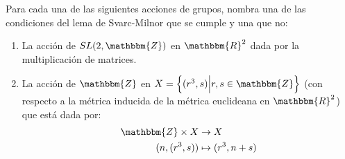 \documentclass[12pt]{report}
\newcounter{it}
\theoremstyle{largebreak}
\newcommand{\bbm}[1]{\ensuremath{\mathbbm{#1}}}
\begin{document}
    \begin{excer}
        Para cada una de las siguientes acciones de grupos, nombra una de las condiciones del lema de Svarc-Milnor que se cumple y una que no:
        \begin{enumerate}[label = \textit{(\alph*)}]
            \item La acción de $SL(2,\bbm{Z})$ en $\bbm{R}^2$ dada por la multiplicación de matrices.
            \item La acción de $\bbm{Z}$ en $X=\left\{(r^3,s)\Big|r,s\in\bbm{Z} \right\}$ (con respecto a la métrica inducida de la métrica euclideana en $\bbm{R}^2$) que está dada por:
            \begin{equation*}
                \begin{split}
                    \bbm{Z}\times X&\rightarrow X\\
                    (n,(r^3,s))&\mapsto (r^3,n+s)\\
                \end{split}
            \end{equation*}
        \end{enumerate}
    \end{excer}
\end{document}
